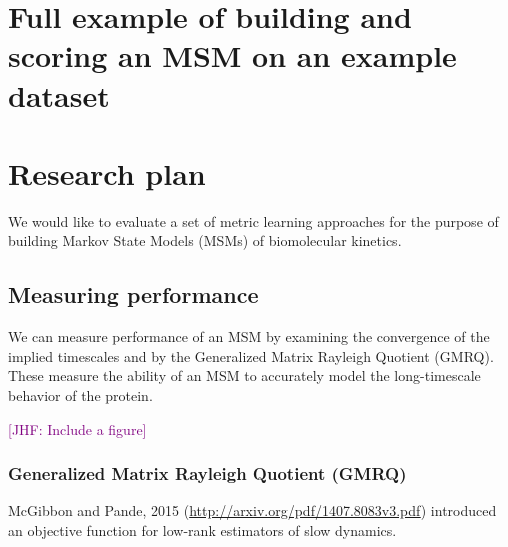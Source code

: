\documentclass[aps,prl,preprint,nofootinbib,superscriptaddress,linenumbers]{revtex4-1}
\newcommand{\jhfcomment}[1]{\textcolor{purple}{[JHF: #1]}} 	%
\begin{document}

\section{Full example of building and scoring an MSM on an example dataset}


\section{Research plan}
We would like to evaluate a set of metric learning approaches for the purpose of building Markov State Models (MSMs) of biomolecular kinetics.

\subsection{Measuring performance}
We can measure performance of an MSM by examining the convergence of the implied timescales and by the Generalized Matrix Rayleigh Quotient (GMRQ). These measure the ability of an MSM to accurately model the long-timescale behavior of the protein.

\jhfcomment{Include a figure}


\subsubsection{Generalized Matrix Rayleigh Quotient (GMRQ)}
McGibbon and Pande, 2015 (\url{http://arxiv.org/pdf/1407.8083v3.pdf}) introduced an objective function for low-rank estimators of slow dynamics.
\end{document}
